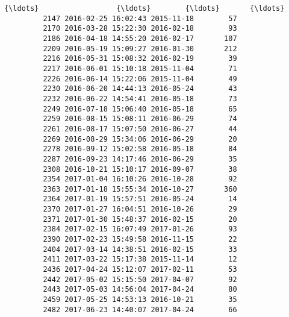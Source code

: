 \documentclass[11pt]{article}
\begin{document}
\begin{Verbatim}[commandchars=\\\{\}]
         {\ldots}                  {\ldots}        {\ldots}       {\ldots}   
         2147 2016-02-25 16:02:43 2015-11-18        57   
         2170 2016-03-28 15:22:30 2016-02-18        93   
         2186 2016-04-18 14:55:20 2016-02-17       107   
         2209 2016-05-19 15:09:27 2016-01-30       212   
         2216 2016-05-31 15:08:32 2016-02-19        39   
         2217 2016-06-01 15:10:18 2015-11-04        71   
         2226 2016-06-14 15:22:06 2015-11-04        49   
         2230 2016-06-20 14:44:13 2016-05-24        43   
         2232 2016-06-22 14:54:41 2016-05-18        73   
         2249 2016-07-18 15:06:40 2016-05-18        65   
         2259 2016-08-15 15:08:11 2016-06-29        74   
         2261 2016-08-17 15:07:50 2016-06-27        44   
         2269 2016-08-29 15:34:06 2016-06-29        20   
         2278 2016-09-12 15:02:58 2016-05-18        84   
         2287 2016-09-23 14:17:46 2016-06-29        35   
         2308 2016-10-21 15:10:17 2016-09-07        38   
         2354 2017-01-04 16:10:26 2016-10-28        92   
         2363 2017-01-18 15:55:34 2016-10-27       360   
         2364 2017-01-19 15:57:51 2016-05-24        14   
         2370 2017-01-27 16:04:51 2016-10-26        29   
         2371 2017-01-30 15:48:37 2016-02-15        20   
         2384 2017-02-15 16:07:49 2017-01-26        93   
         2390 2017-02-23 15:49:58 2016-11-15        22   
         2404 2017-03-14 14:38:51 2016-02-15        33   
         2411 2017-03-22 15:17:38 2015-11-14        12   
         2436 2017-04-24 15:12:07 2017-02-11        53   
         2442 2017-05-02 15:15:50 2017-04-07        92   
         2443 2017-05-03 14:56:04 2017-04-24        80   
         2459 2017-05-25 14:53:13 2016-10-21        35   
         2482 2017-06-23 14:40:07 2017-04-24        66   
         

\end{Verbatim}
\end{document}
